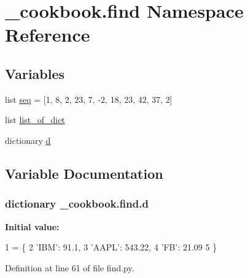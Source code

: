 \hypertarget{namespace__cookbook_1_1find}{\section{\-\_\-cookbook.\-find Namespace Reference}
\label{namespace__cookbook_1_1find}
}
\subsection*{Variables}
\begin{DoxyCompactItemize}
\item 
list \hyperlink{namespace__cookbook_1_1find_a2b63929bb9d60c107a94ede0430dd2c6}{seq} = \mbox{[}1, 8, 2, 23, 7, -\/2, 18, 23, 42, 37, 2\mbox{]}
\item 
list \hyperlink{namespace__cookbook_1_1find_a687bf0a1e78a409f1fe7c38291568113}{list\-\_\-of\-\_\-dict}
\item 
dictionary \hyperlink{namespace__cookbook_1_1find_ad505b83a6410c8ac07573995e48df338}{d}
\end{DoxyCompactItemize}


\subsection{Variable Documentation}
\hypertarget{namespace__cookbook_1_1find_ad505b83a6410c8ac07573995e48df338}{
\subsubsection[{d}]{\setlength{\rightskip}{0pt plus 5cm}dictionary \-\_\-cookbook.\-find.\-d}}\label{namespace__cookbook_1_1find_ad505b83a6410c8ac07573995e48df338}
{\bfseries Initial value\-:}
\begin{DoxyCode}
1 = \{
2         \textcolor{stringliteral}{'IBM'}: 91.1,
3         \textcolor{stringliteral}{'AAPL'}: 543.22,
4         \textcolor{stringliteral}{'FB'}: 21.09
5 \}
\end{DoxyCode}


Definition at line 61 of file find.\-py.

